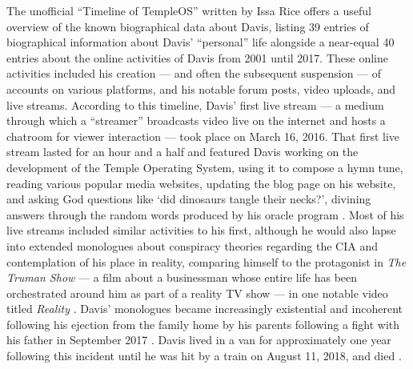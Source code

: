 \documentclass[Draft.tex]{subfiles}
\begin{document}
The unofficial ``Timeline of TempleOS'' written by Issa Rice
\parencite*{Rice18} offers a useful overview of the known
biographical data about Davis, listing 39 entries of biographical information
about Davis' ``personal'' life alongside a near-equal 40 entries about
the online activities of Davis from 2001 until 2017.
These online activities included his creation --- and
often the subsequent suspension --- of accounts on various platforms,
and his notable forum posts, video uploads, and live streams.
According to this timeline, Davis' first live stream ---
a medium through which a ``streamer'' broadcasts video live on the internet
and hosts a chatroom for viewer interaction --- took place on March 16, 2016.
That first live stream lasted for an hour and a half and featured Davis
working on the development of the Temple Operating System,
using it to compose a hymn tune, reading various popular media websites,
updating the blog page on his website, and asking God questions
like `did dinosaurs tangle their necks?', divining answers through the
random words produced by his oracle program
\parencite[59:05]{FirstLiveStream}.
Most of his live streams included similar activities to his first,
although he would also lapse into extended monologues about
conspiracy theories regarding the CIA and contemplation of his place in
reality, comparing himself to the protagonist in \textit{The Truman Show}
--- a film about a businessman whose entire life has been
orchestrated around him as part of a reality TV show ---
in one notable video titled \textit{Reality} \parencite{Reality}.
Davis' monologues became increasingly existential and incoherent following
his ejection from the family home by his parents following a fight
with his father in September 2017 \parencite{Homeless}.
Davis lived in a van for approximately one year following this incident
until he was hit by a train on August 11, 2018, and died \parencite{Cecil18}.
\end{document}
